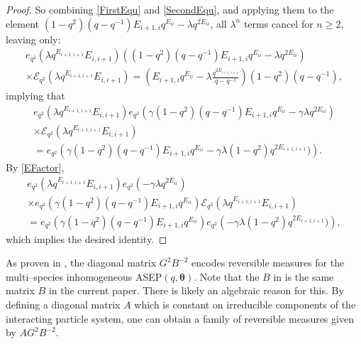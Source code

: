 \documentclass{ximera}
\begin{document}
\begin{proof}
So combining \eqref{FirstEqu} and \eqref{SecondEqu}, and applying them to the element 
\newline 
$(1-q^2)(q-q^{-1})E_{i+1,i}q^{E_{ii}} - \lambda q^{2E_{ii}}$, all $\lambda^n$ terms cancel for $n\geq 2$, leaving only:
\begin{multline*}
e_{q^2}(\lambda q^{E_{i+1,i+1}}E_{i,i+1}) \left((1-q^2)(q-q^{-1})E_{i+1,i}q^{E_{ii}} - \lambda q^{2E_{ii}}\right) \\
\times\mathcal{E}_{q^2}(\lambda q^{E_{i+1,i+1}}E_{i,i+1}) 
=  \left(E_{i+1,i} q^{E_{ii}}  - \lambda\frac{q^{2E_{i+1,i+1}}}{q-q^{-1}}  \right) (1-q^2)(q-q^{-1}),
\end{multline*}
implying that
\begin{multline*}
e_{q^2}(\lambda q^{E_{i+1,i+1}}E_{i,i+1}) 
e_{q^2}
\left(\gamma(1-q^2)(q-q^{-1})E_{i+1,i}q^{E_{ii}} -\gamma \lambda q^{2E_{ii}}\right) 
\\
\times\mathcal{E}_{q^2}(\lambda q^{E_{i+1,i+1}}E_{i,i+1}) \\=  e_{q^2} \left(\gamma(1-q^2)(q-q^{-1}) E_{i+1,i} q^{E_{ii}}  - \gamma\lambda(1-q^2){q^{2E_{i+1,i+1}}}) \right) .
\end{multline*}
By \eqref{EFactor},
\begin{multline*}
e_{q^2}(\lambda q^{E_{i+1,i+1}}E_{i,i+1}) 
 e_{q^2}\left( -\gamma \lambda q^{2E_{ii}}\right) 
\\
\times e_{q^2}\left(\gamma(1-q^2)(q-q^{-1})E_{i+1,i}q^{E_{ii}}\right) 
\mathcal{E}_{q^2}(\lambda q^{E_{i+1,i+1}}E_{i,i+1}) \\
=  e_{q^2} \left(\gamma(1-q^2)(q-q^{-1}) E_{i+1,i} q^{E_{ii}}  \right)e_{q^2}\left(- \gamma \lambda(1-q^2){q^{2E_{i+1,i+1}}}) \right) ,
\end{multline*}
which implies the desired identity.

\end{proof}
As proven in \cite{Kuan-IMRN}, the diagonal matrix $G^2B^{-2}$ encodes reversible measures for the multi--species inhomogeneous ASEP$(q,\boldsymbol\theta)$. Note that the $B$ in \cite{Kuan-IMRN} is the same matrix $B$ in the current paper. There is likely an algebraic reason for this. By defining a diagonal matrix $A$ which is constant on irreducible components of the interacting particle system, one can obtain a family of reversible measures given by $AG^2B^{-2}$. 
\end{document}
